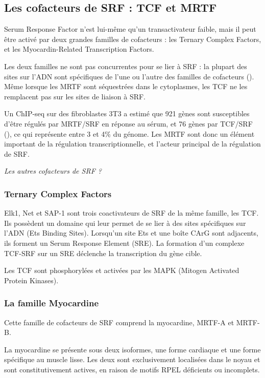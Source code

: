 \documentclass{report}
\begin{document}
\subsection{Les cofacteurs de SRF : TCF et MRTF}

Serum Response Factor n'est lui-même qu'un transactivateur faible, mais il peut être activé par deux grandes familles de cofacteurs : les Ternary Complex Factors, et les Myocardin-Related Transcription Factors. 

Les deux familles ne sont pas concurrentes pour se lier à SRF : la plupart des sites sur l'ADN sont spécifiques de l'une ou l'autre des familles de cofacteurs (\cite{esnault_rho-actin_2014}). Même lorsque les MRTF sont séquestrées dans le cytoplasmes, les TCF ne les remplacent pas sur les sites de liaison à SRF. 

Un ChIP-seq sur des fibroblastes 3T3 a estimé que 921 gènes sont susceptibles d'être régulés par MRTF/SRF en réponse au sérum, et 76 gènes par TCF/SRF (\cite{esnault_rho-actin_2014}), ce qui représente entre 3 et 4\% du génome. Les MRTF sont donc un élément important de la régulation transcriptionnelle, et l'acteur principal de la régulation de SRF. 

\emph{Les autres cofacteurs de SRF ? }

\subsubsection{Ternary Complex Factors}

Elk1, Net et SAP-1 sont trois coactivateurs de SRF de la même famille, les TCF. Ils possèdent un domaine qui leur permet de se lier à des sites spécifiques sur l'ADN (Ets Binding Sites). 
Lorsqu'un site Ets et une boîte CArG sont adjacents, ils forment un Serum Response Element (SRE). La formation d'un complexe TCF-SRF sur un SRE déclenche la transcription du gène cible. 

Les TCF sont phosphorylées et activées par les MAPK (Mitogen Activated Protein Kinases). 


\subsubsection{La famille Myocardine}

Cette famille de cofacteurs de SRF comprend la myocardine, MRTF-A et MRTF-B.

La myocardine se présente sous deux isoformes, une forme cardiaque et une forme spécifique au muscle lisse. Les deux sont exclusivement localisées dans le noyau et sont constitutivement actives, en raison de motifs RPEL déficients ou incomplets. 
\end{document}

